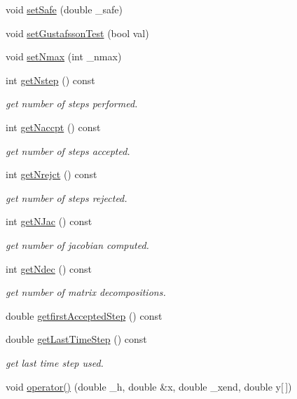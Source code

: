 \begin{DoxyCompactItemize}
\item 
void \hyperlink{classodes_1_1Rodascc_ad4609ce00a9a0471ba3bb259c1a0ac04}{set\-Safe} (double \-\_\-safe)
\item 
void \hyperlink{classodes_1_1Rodascc_aa20bc3db9ea9a82df0a35704ca475935}{set\-Gustafsson\-Test} (bool val)
\item 
void \hyperlink{classodes_1_1Rodascc_a5816aaf979a5e929cba72cd9cc00573d}{set\-Nmax} (int \-\_\-nmax)
\item 
int \hyperlink{classodes_1_1Rodascc_a0a6be857980154efd190f50f3d756881}{get\-Nstep} () const 
\begin{DoxyCompactList}\small\item\em get number of steps performed. \end{DoxyCompactList}\item 
int \hyperlink{classodes_1_1Rodascc_a4046780600aadc352fcce25e99f3ec61}{get\-Naccpt} () const 
\begin{DoxyCompactList}\small\item\em get number of steps accepted. \end{DoxyCompactList}\item 
int \hyperlink{classodes_1_1Rodascc_af1c89412cd970c518146e97ada106966}{get\-Nrejct} () const 
\begin{DoxyCompactList}\small\item\em get number of steps rejected. \end{DoxyCompactList}\item 
int \hyperlink{classodes_1_1Rodascc_a156b068424ee17940fd6fa6fdc35cfd9}{get\-N\-Jac} () const 
\begin{DoxyCompactList}\small\item\em get number of jacobian computed. \end{DoxyCompactList}\item 
int \hyperlink{classodes_1_1Rodascc_a8413594121e47a085cf67a5b38249f1a}{get\-Ndec} () const 
\begin{DoxyCompactList}\small\item\em get number of matrix decompositions. \end{DoxyCompactList}\item 
double \hyperlink{classodes_1_1Rodascc_aecff054b45ee9686988e21f153b66494}{getfirst\-Accepted\-Step} () const 
\item 
double \hyperlink{classodes_1_1Rodascc_aa74f83d3be8888202775c79b4f6a8dc5}{get\-Last\-Time\-Step} () const 
\begin{DoxyCompactList}\small\item\em get last time step used. \end{DoxyCompactList}\item 
void \hyperlink{classodes_1_1Rodascc_a3427e502fb47ec1769c9e7cef26ed695}{operator()} (double \-\_\-h, double \&x, double \-\_\-xend, double y\mbox{[}$\,$\mbox{]})
\end{DoxyCompactItemize}
